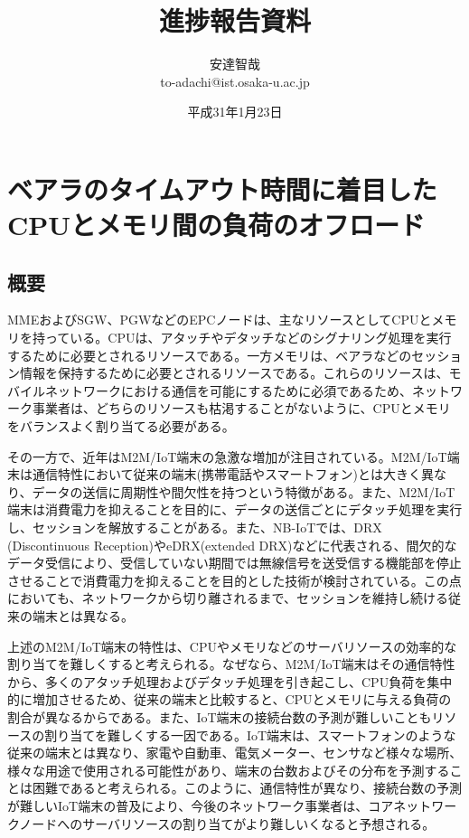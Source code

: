 \documentclass[a4j]{ujarticle}
\title{進捗報告資料}
\author{安達智哉\\to-adachi@ist.osaka-u.ac.jp}
\date{平成31年1月23日}
\begin{document}
\maketitle

\section{ベアラのタイムアウト時間に着目したCPUとメモリ間の負荷のオフロード}

\subsection{概要}
\label{sec:abs}
MMEおよびSGW、PGWなどのEPCノードは、主なリソースとしてCPUとメモリを持っている。CPUは、アタッチやデタッチなどのシグナリング処理を実行するために必要とされるリソースである。一方メモリは、ベアラなどのセッション情報を保持するために必要とされるリソースである。これらのリソースは、モバイルネットワークにおける通信を可能にするために必須であるため、ネットワーク事業者は、どちらのリソースも枯渇することがないように、CPUとメモリをバランスよく割り当てる必要がある。

その一方で、近年はM2M/IoT端末の急激な増加が注目されている。M2M/IoT端末は通信特性において従来の端末(携帯電話やスマートフォン)とは大きく異なり、データの送信に周期性や間欠性を持つという特徴がある。また、M2M/IoT端末は消費電力を抑えることを目的に、データの送信ごとにデタッチ処理を実行し、セッションを解放することがある。また、NB-IoTでは、DRX (Discontinuous Reception)やeDRX(extended DRX)などに代表される、間欠的なデータ受信により、受信していない期間では無線信号を送受信する機能部を停止させることで消費電力を抑えることを目的とした技術が検討されている\cite{LTERelease13におけるIoTを実現する新技術}。この点においても、ネットワークから切り離されるまで、セッションを維持し続ける従来の端末とは異なる。

上述のM2M/IoT端末の特性は、CPUやメモリなどのサーバリソースの効率的な割り当てを難しくすると考えられる。なぜなら、M2M/IoT端末はその通信特性から、多くのアタッチ処理およびデタッチ処理を引き起こし、CPU負荷を集中的に増加させるため、従来の端末と比較すると、CPUとメモリに与える負荷の割合が異なるからである。また、IoT端末の接続台数の予測が難しいこともリソースの割り当てを難しくする一因である。IoT端末は、スマートフォンのような従来の端末とは異なり、家電や自動車、電気メーター、センサなど様々な場所、様々な用途で使用される可能性があり、端末の台数およびその分布を予測することは困難であると考えられる。このように、通信特性が異なり、接続台数の予測が難しいIoT端末の普及により、今後のネットワーク事業者は、コアネットワークノードへのサーバリソースの割り当てがより難しいくなると予想される。
\end{document}
